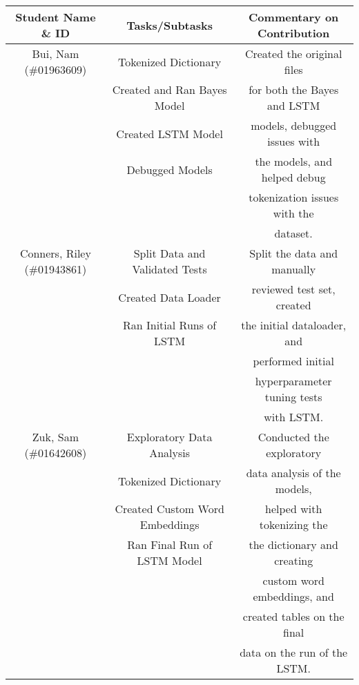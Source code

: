 \documentclass[11pt]{article}
\begin{document}
\begin{table}[H]
    \centering
    \begin{tabular}{c|c|c}
        \hline
        Student Name \& ID          & Tasks/Subtasks                 & Commentary on Contribution \\
        \hline
        Bui, Nam (\#01963609)       & Tokenized Dictionary           & Created the original files \\
                                    & Created and Ran Bayes Model    & for both the Bayes and LSTM\\
                                    & Created LSTM Model             &models, debugged issues with\\
                                    & Debugged Models                &the models, and helped debug\\ 
                                    &                                &tokenization issues with the\\ 
                                    &                                & dataset.                   \\
        \hline
        Conners, Riley (\#01943861) & Split Data and Validated Tests &Split the data and manually \\
                                    & Created Data Loader            &reviewed test set, created  \\
                                    & Ran Initial Runs of LSTM       &the initial dataloader, and \\
                                    &                                &performed initial           \\
                                    &                                &hyperparameter tuning tests \\
                                    &                                & with LSTM.                 \\
        \hline
        Zuk, Sam (\#01642608)       & Exploratory Data Analysis      & Conducted the exploratory  \\
                                    & Tokenized Dictionary           &data analysis of the models,\\
                                    & Created Custom Word Embeddings &helped with tokenizing the  \\
                                    & Ran Final Run of LSTM Model    &the dictionary and creating \\
                                    &                                &custom word embeddings, and \\
                                    &                                &created tables on the final \\
                                    &                                &data on the run of the LSTM.\\
        \hline
    \end{tabular}
    \label{tab:my_label}
\end{table}




\end{document}
